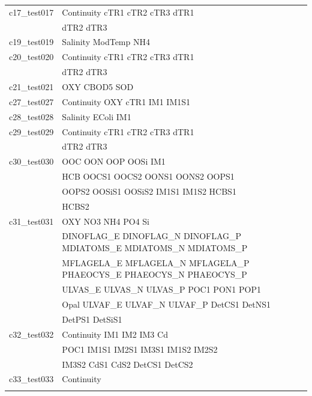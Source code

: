 \begin{longtable}{ll}
c17\_test017 & Continuity cTR1 cTR2 cTR3 dTR1 \\ 
 & dTR2 dTR3 \\
c19\_test019 & Salinity ModTemp NH4 \\
c20\_test020 & Continuity cTR1 cTR2 cTR3 dTR1 \\ 
 & dTR2 dTR3 \\
c21\_test021 & OXY CBOD5 SOD \\
c27\_test027 & Continuity OXY cTR1 IM1 IM1S1 \\
c28\_test028 & Salinity EColi IM1 \\
c29\_test029 & Continuity cTR1 cTR2 cTR3 dTR1 \\ 
 & dTR2 dTR3 \\
c30\_test030 & OOC OON OOP OOSi IM1 \\ 
 & HCB OOCS1 OOCS2 OONS1 OONS2 OOPS1 \\ 
 & OOPS2 OOSiS1 OOSiS2 IM1S1 IM1S2 HCBS1 \\ 
 & HCBS2 \\
c31\_test031 & OXY NO3 NH4 PO4 Si \\ 
 & DINOFLAG\_E DINOFLAG\_N DINOFLAG\_P MDIATOMS\_E MDIATOMS\_N MDIATOMS\_P \\ 
 & MFLAGELA\_E MFLAGELA\_N MFLAGELA\_P PHAEOCYS\_E PHAEOCYS\_N PHAEOCYS\_P \\ 
 & ULVAS\_E ULVAS\_N ULVAS\_P POC1 PON1 POP1 \\ 
 & Opal ULVAF\_E ULVAF\_N ULVAF\_P DetCS1 DetNS1 \\ 
 & DetPS1 DetSiS1 \\
c32\_test032 & Continuity IM1 IM2 IM3 Cd \\ 
 & POC1 IM1S1 IM2S1 IM3S1 IM1S2 IM2S2 \\ 
 & IM3S2 CdS1 CdS2 DetCS1 DetCS2 \\
c33\_test033 & Continuity \\

\hline \\
\end{longtable}
